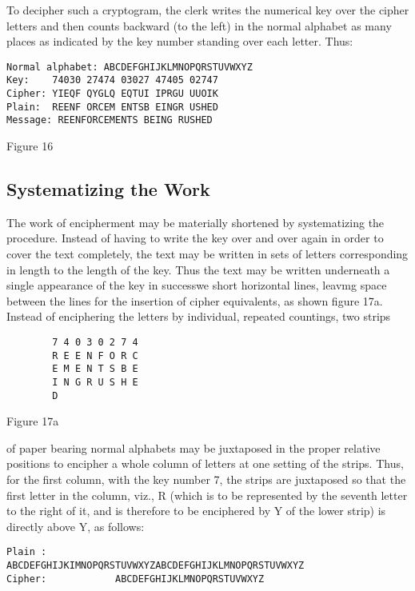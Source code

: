 \mypara To decipher such a cryptogram, the clerk writes the numerical key
over the cipher letters and then counts backward (to the left) in the
normal alphabet as many places as indicated by the key number standing
over each letter. Thus:

\begin{textfigure}
\begin{verbatim}
Normal alphabet: ABCDEFGHIJKLMNOPQRSTUVWXYZ
Key:    74030 27474 03027 47405 02747
Cipher: YIEQF QYGLQ EQTUI IPRGU UUOIK
Plain:  REENF ORCEM ENTSB EINGR USHED
Message: REENFORCEMENTS BEING RUSHED
\end{verbatim}
\caption{Figure 16}
\end{textfigure}

\subsection{Systematizing the Work}

The work of encipherment may be materially shortened by systematizing the procedure. Instead of having to write the key over and over again
in order to cover the text completely, the text may be written in sets of
letters corresponding in length to the length of
the key. Thus the text may be written underneath
a single appearance of the key in successwe short
horizontal lines, leavmg space between the lines
for the insertion of cipher equivalents, as shown
ﬁgure 17a. Instead of enciphering the letters by individual, repeated countings, two strips

\begin{textfigure}
        \begin{verbatim}
        7 4 0 3 0 2 7 4
        R E E N F O R C
        E M E N T S B E
        I N G R U S H E
        D
        \end{verbatim}
        \caption{Figure 17a}
\end{textfigure}


of paper bearing normal alphabets may be juxtaposed in the proper relative positions to encipher
a whole column of letters at one setting of the strips. Thus, for the ﬁrst
column, with the key number 7, the strips are juxtaposed so that the ﬁrst
letter in the column, viz., R (which is to be represented by the seventh
letter to the right of it, and is therefore to be enciphered by Y of the
lower strip) is directly above Y, as follows:

\begin{verbatim}
Plain :
ABCDEFGHIJKIMNOPQRSTUVWXYZABCDEFGHIJKLMNOPQRSTUVWXYZ
Cipher:            ABCDEFGHIJKLMNOPQRSTUVWXYZ
\end{verbatim}

